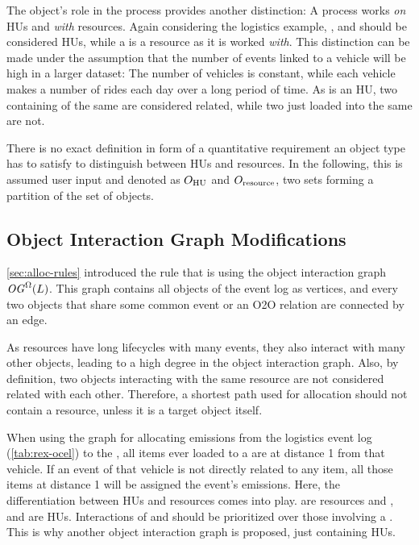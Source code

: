 The object's role in the process provides another distinction: A process works \textit{on} HUs and \textit{with} resources.
Again considering the logistics example, ,  and  should be considered HUs, while a  is a resource as it is worked \textit{with}. This distinction can be made under the assumption that the number of events linked to a vehicle will be high in a larger dataset: The number of vehicles is constant, while each vehicle makes a number of rides each day over a long period of time.
%
As  is an HU, two  containing  of the same  are considered related, while two  just loaded into the same  are not.

There is no exact definition in form of a quantitative requirement an object type has to satisfy to distinguish between HUs and resources.
In the following, this is assumed user input and denoted as
$O_{\mathrm{HU}}$ and $O_{\mathrm{resource}}$, two sets forming a partition of the set of objects.

\subsection{Object Interaction Graph Modifications}
\label{sec:alloc-og}

\autoref{sec:alloc-rules} introduced the  rule that is using the object interaction graph $\mathit{OG}^\Omega(L)$.
This graph contains all objects of the event log as vertices,
and every two objects that share some common event or an O2O relation are connected by an edge.

As resources have long lifecycles with many events, they also interact with many other objects, leading to a high degree in the object interaction graph.
Also, by definition, two objects interacting with the same resource are not considered related with each other. Therefore, a shortest path used for allocation should not contain a resource, unless it is a target object itself.

When using the graph for allocating emissions from the logistics event log (\autoref{tab:rex-ocel}) to the ,
all items ever loaded to a  are at distance 1 from that vehicle. If an event of that vehicle is not directly related to any item, all those items at distance 1 will be assigned the event's emissions.
Here, the differentiation between HUs and resources comes into play.  are resources and ,  and  are HUs. Interactions of  and  should be prioritized over those involving a .
This is why another object interaction graph is proposed, just containing HUs.

